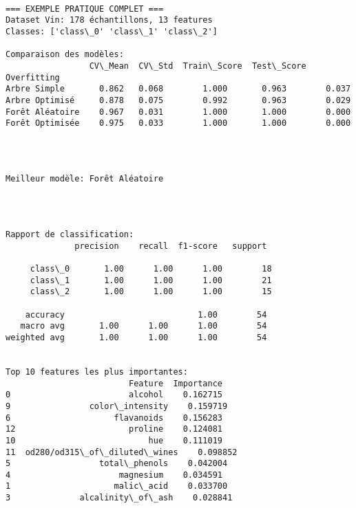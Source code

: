 \documentclass[11pt]{article}
\begin{document}
    \begin{Verbatim}[commandchars=\\\{\}]

=== EXEMPLE PRATIQUE COMPLET ===
Dataset Vin: 178 échantillons, 13 features
Classes: ['class\_0' 'class\_1' 'class\_2']

Comparaison des modèles:
                 CV\_Mean  CV\_Std  Train\_Score  Test\_Score  Overfitting
Arbre Simple       0.862   0.068        1.000       0.963        0.037
Arbre Optimisé     0.878   0.075        0.992       0.963        0.029
Forêt Aléatoire    0.967   0.031        1.000       1.000        0.000
Forêt Optimisée    0.975   0.033        1.000       1.000        0.000
    \end{Verbatim}

    \begin{center}
    \end{center}
    { \hspace*{\fill} \\}
    
    \begin{Verbatim}[commandchars=\\\{\}]

Meilleur modèle: Forêt Aléatoire
    \end{Verbatim}

    \begin{center}
    \end{center}
    { \hspace*{\fill} \\}
    
    \begin{Verbatim}[commandchars=\\\{\}]

Rapport de classification:
              precision    recall  f1-score   support

     class\_0       1.00      1.00      1.00        18
     class\_1       1.00      1.00      1.00        21
     class\_2       1.00      1.00      1.00        15

    accuracy                           1.00        54
   macro avg       1.00      1.00      1.00        54
weighted avg       1.00      1.00      1.00        54


Top 10 features les plus importantes:
                         Feature  Importance
0                        alcohol    0.162715
9                color\_intensity    0.159719
6                     flavanoids    0.156283
12                       proline    0.124081
10                           hue    0.111019
11  od280/od315\_of\_diluted\_wines    0.098852
5                  total\_phenols    0.042004
4                      magnesium    0.034591
1                     malic\_acid    0.033700
3              alcalinity\_of\_ash    0.028841
    \end{Verbatim}
\end{document}
